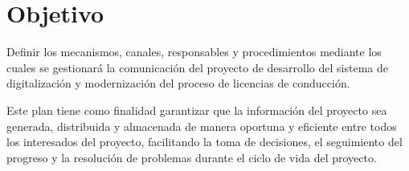 \section{Objetivo}
Definir los mecanismos, canales, responsables y procedimientos mediante los cuales se gestionará la comunicación del proyecto de desarrollo del sistema de digitalización y modernización del proceso de licencias de conducción.

Este plan tiene como finalidad garantizar que la información del proyecto sea generada, distribuida y almacenada de manera oportuna y eficiente entre todos los interesados del proyecto, facilitando la toma de decisiones, el seguimiento del progreso y la resolución de problemas durante el ciclo de vida del proyecto.